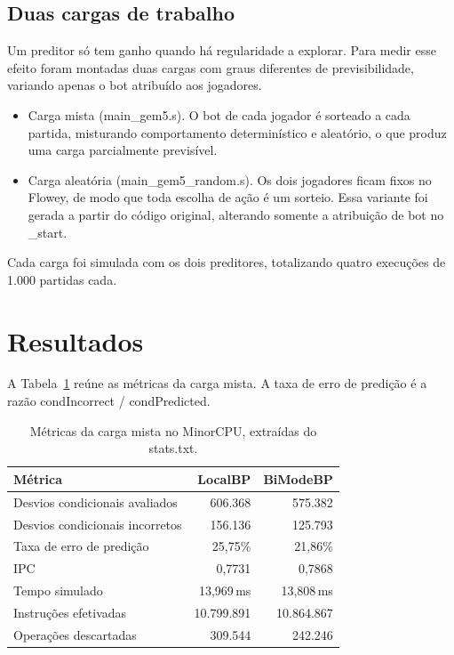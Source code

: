 \documentclass[12pt]{article}
\begin{document}
\subsection{Duas cargas de trabalho}
\label{sec:cargas}

Um preditor só tem ganho quando há regularidade a explorar. Para medir esse
efeito foram montadas duas cargas com graus diferentes de previsibilidade,
variando apenas o bot atribuído aos jogadores.

\begin{itemize}[nosep]
  \item Carga mista (main\_gem5.s). O bot de cada jogador é sorteado a cada
    partida, misturando comportamento determinístico e aleatório, o que
    produz uma carga parcialmente previsível.
  \item Carga aleatória (main\_gem5\_random.s). Os dois jogadores ficam
    fixos no Flowey, de modo que toda escolha de ação é um sorteio. Essa
    variante foi gerada a partir do código original, alterando somente a
    atribuição de bot no \_start.
\end{itemize}

Cada carga foi simulada com os dois preditores, totalizando quatro execuções
de 1.000 partidas cada.

\section{Resultados}

A Tabela~\ref{tab:metricas} reúne as métricas da carga mista. A taxa de erro
de predição é a razão condIncorrect / condPredicted.

\begin{table}[ht]
\centering
\caption{Métricas da carga mista no MinorCPU, extraídas do stats.txt.}
\label{tab:metricas}
\begin{tabular}{lrr}
\toprule
Métrica & LocalBP & BiModeBP \\
\midrule
Desvios condicionais avaliados & 606.368 & 575.382 \\
Desvios condicionais incorretos & 156.136 & 125.793 \\
Taxa de erro de predição & 25,75\% & 21,86\% \\
IPC & 0,7731 & 0,7868 \\
Tempo simulado & 13,969\,ms & 13,808\,ms \\
Instruções efetivadas & 10.799.891 & 10.864.867 \\
Operações descartadas & 309.544 & 242.246 \\
\bottomrule
\end{tabular}
\end{table}
\end{document}
